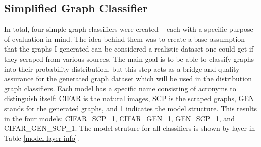 \documentclass[12pt]{article}
\begin{document}
        \subsection{Simplified Graph Classifier}

            In total, four simple graph classifiers were created -- each with a specific purpose of evaluation in mind. 
            The idea behind them was to create a base assumption that the graphs I generated can be considered a realistic dataset 
            one could get if they scraped from various sources. 
            The main goal is to be able to classify graphs into their probability distribution, 
            but this step acts as a bridge and quality assurance for the generated graph dataset 
            which will be used in the distribution graph classifiers. 
            Each model has a specific name consisting of acronyms to distinguish itself: 
            CIFAR is the natural images, SCP is the scraped graphs, GEN stands for the generated graphs, 
            and 1 indicates the model structure. This results in the four models: CIFAR\_SCP\_1, CIFAR\_GEN\_1, GEN\_SCP\_1, 
            and CIFAR\_GEN\_SCP\_1. The model struture for all classifiers is shown by layer in Table \ref{model-layer-info}.
\end{document}
